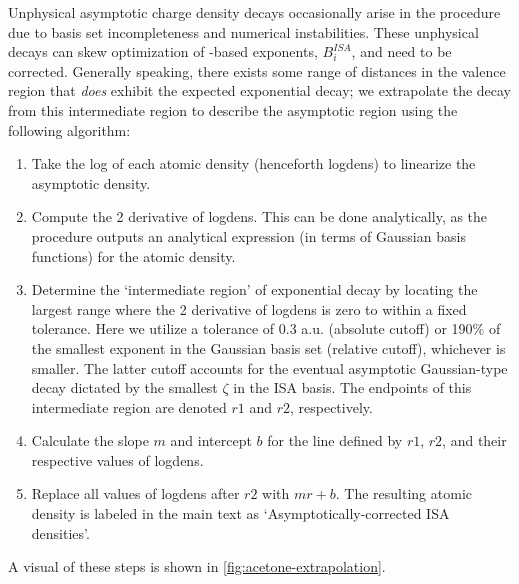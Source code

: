 
Unphysical asymptotic charge density decays occasionally arise in the
\isa 
procedure due to basis set incompleteness and numerical instabilities. These
unphysical decays can
skew optimization of \isa-based exponents, $B_i^{ISA}$, and need to be corrected.
Generally speaking, there exists some range of distances in the valence region
that \emph{does} exhibit the expected exponential decay; we extrapolate the
decay from this intermediate region to describe the asymptotic region using
the following algorithm:

\begin{enumerate}

\item Take the log of each atomic density (henceforth logdens) to linearize
the asymptotic density.
\label{step1}
\item Compute the 2 derivative of logdens. This can be
done analytically, as the \isa procedure outputs an analytical expression (in
terms of Gaussian basis functions) for the atomic density.
\label{step2}
\item Determine the `intermediate region' of exponential decay by locating the
largest range where the 2 derivative of logdens is zero
to within a fixed tolerance.  Here we utilize a tolerance of 0.3 a.u. (absolute cutoff)
or 190\% of the smallest exponent in the Gaussian basis set (relative cutoff),
whichever is smaller.  
The latter cutoff accounts for the eventual asymptotic Gaussian-type decay
dictated by the smallest $\zeta$ in the ISA basis.
The endpoints of this intermediate region are denoted $r1$ and $r2$, respectively.
\item Calculate the slope $m$ and intercept $b$ for the line defined by
$r1$, $r2$, and their respective values of logdens. 
\label{step3}
\item Replace all values of logdens after $r2$ with $mr + b$.  The resulting
atomic density is labeled in the main text as `Asymptotically-corrected ISA
densities'.
\label{step4}

\end{enumerate}

A visual of these steps is shown in \ref{fig:acetone-extrapolation}.


